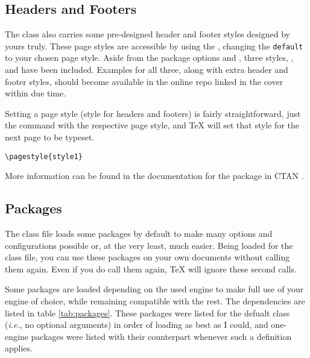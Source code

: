 \documentclass[palatino,english]{ist-report}
\begin{document}
\subsection{Headers and Footers}

The class also carries some pre-designed header and footer styles designed by yours truly. These page styles are accessible by using the \texttt{\pagestyle{default}}, changing the \texttt{default} to your chosen page style. Aside from the package  options  and , three styles, ,  and  have been included. Examples for all three, along with extra header and footer styles, should become available in the online repo linked in the cover within due time.

Setting a page style (style for headers and footers) is fairly straightforward, just the \texttt{\pagestyle} command with the respective page style, and \TeX{} will set that style for the next page to be typeset.
\begin{verbatim}
\pagestyle{style1}
\end{verbatim}
More information can be found in the documentation for the  package in CTAN \cite{ctan}.


\subsection{Packages}\label{sec:packages}

The class file loads some packages by default to make many options and configurations possible or, at the very least, much easier. Being loaded for the class file, you can use these packages on your own documents without calling them again. Even if you do call them again, \TeX{} will ignore these second calls.

Some packages are loaded depending on the used engine to make full use of your engine of choice, while remaining compatible with the rest. The dependencies are listed in table \ref{tab:packages}. These packages were listed for the defualt class (\textit{i.e.}, no optional arguments) in order of loading as best as I could, and one-engine packages were listed with their counterpart whenever such a definition applies.
\end{document}
